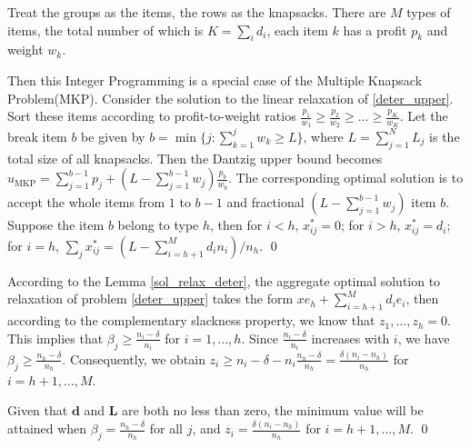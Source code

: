 \begin{pf}
  Treat the groups as the items, the rows as the knapsacks. There are $M$ types of items, the total number of which is $K = \sum_{i} d_i$, each item $k$ has a profit $p_k$ and weight $w_k$. 
  
  Then this Integer Programming is a special case of the Multiple Knapsack Problem(MKP). Consider the solution to the linear relaxation of \eqref{deter_upper}. Sort these items according to profit-to-weight ratios $\frac{p_1}{w_1} \geq \frac{p_2}{w_2} \geq \ldots \geq \frac{p_K}{w_K}$. 
  Let the break item $b$ be given by $b=\min \{j: \sum_{k=1}^j w_k \geq L\}$, where $L = \sum_{j=1}^{N} L_j$ is the total size of all knapsacks. Then the Dantzig upper bound \cite{dantzig1957discrete} becomes $u_{\mathrm{MKP}}=\sum_{j=1}^{b-1} p_j+\left(L-\sum_{j=1}^{b-1} w_j\right) \frac{p_b}{w_b}$. The corresponding optimal solution is to accept the whole items from $1$ to $b-1$ and fractional $(L-\sum_{j=1}^{b-1} w_j)$ item $b$. Suppose the item $b$ belong to type $h$, then for $i < h$, $x_{ij}^{*} = 0$; for $i > h$, $x_{ij}^{*} = d_{i}$; for $i = h$, $\sum_{j} x_{ij}^{*} = (L - \sum_{i = h+1}^{M} {d_i n_i})/ n_h$. \qed
\end{pf}

\begin{pf}
  According to the Lemma \ref{sol_relax_deter}, the aggregate optimal solution to relaxation of problem \eqref{deter_upper} takes the form $x e_{h} + \sum_{i=h+1} ^{M} d_{i} e_{i}$, then according to the complementary slackness property, we know that $z_1, \ldots, z_h = 0$. This implies that $\beta_j \geq \frac{n_i - \delta}{n_i}$ for $i = 1,\ldots, h$. Since $\frac{n_i - \delta}{n_i}$ increases with $i$, we have $\beta_j \geq \frac{n_h - \delta}{n_h}$. Consequently, we obtain $z_{i} \geq n_i - \delta - n_i \frac{n_h - \delta}{n_h} = \frac{\delta(n_i-n_h)}{n_h}$ for $i = h+1, \ldots, M$.
  
  Given that $\mathbf{d}$ and $\mathbf{L}$ are both no less than zero, the minimum value will be attained when $\beta_j = \frac{n_h - \delta}{n_h}$ for all $j$, and $z_i = \frac{\delta(n_i-n_h)}{n_h}$ for $i = h+1, \ldots, M$.  \qed
  \end{pf}



